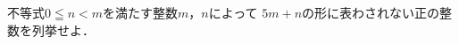 \documentclass[../../main.tex]{subfiles}
\begin{document}
不等式$0 \leqq n<m$を満たす整数$m$，$n$によって
$5m+n$の形に表わされない正の整数を列挙せよ．
\end{document}
